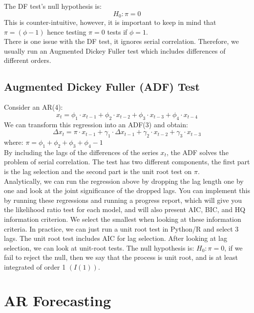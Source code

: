 \documentclass[12pt,letter]{article}
\begin{document}
The DF test's null hypothesis is:$$H_{0}: \pi=0$$ 
This is counter-intuitive, however, it is important to keep in mind that $\pi= (\phi -1)$ hence testing $\pi=0$ tests if $\phi=1$. \\
There is one issue with the DF test, it ignores serial correlation. Therefore, we usually run an Augmented Dickey Fuller test which includes differences of different orders.

\subsection{Augmented Dickey Fuller (ADF) Test}

Consider an AR(4): $$ x_{t}= \phi_{1} \cdot x_{t-1} + \phi_{2} \cdot x_{t-2} + \phi_{3} \cdot x_{t-3} + \phi_{4} \cdot x_{t-4}$$
We can transform this regression into an ADF(3) and obtain:$$ \Delta x_{t}= \pi \cdot x_{t-1} + \gamma_{1} \cdot \Delta x_{t-1} + \gamma_{2} \cdot x_{t-2} + \gamma_{3} \cdot x_{t-3}$$
where: $\pi=\phi_{1}+\phi_{2}+\phi_{3}+\phi_{4}-1$\\

By including the lags of the differences of the series $x_{t}$, the ADF solves the problem of serial correlation. The test has two different components, the first part is the lag selection and the second part is the unit root test on $\pi$.\\
Analytically, we can run the regression above by dropping the lag length one by one and look at the joint significance of the dropped lags. You can implement this by running these regressions and running a progress report, which will give you the likelihood ratio test for each model, and will also present AIC, BIC, and HQ information criterion. We select the smallest when looking at these information criteria. In practice, we can just run a unit root test in Python/R and select 3 lags. The unit root test includes AIC for lag selection. After looking at lag selection, we can look at unit-root tests. The null hypothesis is: $H_{0}: \pi=0$, if we fail to reject the null, then we say that the process is unit root, and is at least integrated of order 1  $\left(I(1)\right)$.   

\section{AR Forecasting}
 
\end{document}
